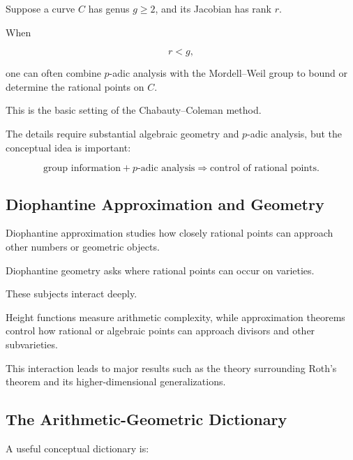 Suppose a curve \(C\) has genus \(g\geq2\), and its Jacobian has rank \(r\).

When

\[ r<g, \]

one can often combine \(p\)-adic analysis with the Mordell--Weil group to
bound or determine the rational points on \(C\).

This is the basic setting of the Chabauty--Coleman method.

The details require substantial algebraic geometry and \(p\)-adic analysis,
but the conceptual idea is important:

\[
\boxed{
\text{group information}
+
\text{\(p\)-adic analysis}
\Longrightarrow
\text{control of rational points}.
}
\]

\subsection{Diophantine Approximation and Geometry}
\label{subsec:approximation-and-diophantine-geometry}

Diophantine approximation studies how closely rational points can approach
other numbers or geometric objects.

Diophantine geometry asks where rational points can occur on varieties.

These subjects interact deeply.

Height functions measure arithmetic complexity, while approximation theorems
control how rational or algebraic points can approach divisors and other
subvarieties.

This interaction leads to major results such as the theory surrounding
Roth's theorem and its higher-dimensional generalizations.

\subsection{The Arithmetic-Geometric Dictionary}
\label{subsec:arithmetic-geometric-dictionary}

A useful conceptual dictionary is:

